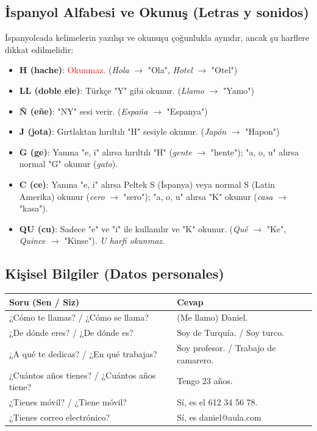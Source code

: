 \documentclass[12pt,a4paper]{article}
\begin{document}
\subsection{İspanyol Alfabesi ve Okunuş (Letras y sonidos)}
İspanyolcada kelimelerin yazılışı ve okunuşu çoğunlukla aynıdır, ancak şu harflere dikkat edilmelidir:
\begin{itemize}
    \item \textbf{H (hache)}: \textcolor{red}{Okunmaz.} (\textit{Hola} $\rightarrow$ "Ola", \textit{Hotel} $\rightarrow$ "Otel")
    \item \textbf{LL (doble ele)}: Türkçe "Y" gibi okunur. (\textit{Llamo} $\rightarrow$ "Yamo")
    \item \textbf{Ñ (eñe)}: "NY" sesi verir. (\textit{España} $\rightarrow$ "Espanya")
    \item \textbf{J (jota)}: Gırtlaktan hırıltılı "H" sesiyle okunur. (\textit{Japón} $\rightarrow$ "Hapon")
    \item \textbf{G (ge)}: Yanına "e, i" alırsa hırıltılı "H" (\textit{gente} $\rightarrow$ "hente"); "a, o, u" alırsa normal "G" okunur (\textit{gato}).
    \item \textbf{C (ce)}: Yanına "e, i" alırsa Peltek S (İspanya) veya normal S (Latin Amerika) okunur (\textit{cero} $\rightarrow$ "sero"); "a, o, u" alırsa "K" okunur (\textit{casa} $\rightarrow$ "kasa").
    \item \textbf{QU (cu)}: Sadece "e" ve "i" ile kullanılır ve "K" okunur. (\textit{Qué} $\rightarrow$ "Ke", \textit{Quince} $\rightarrow$ "Kinse"). \textit{U harfi okunmaz.}
\end{itemize}

\subsection{Kişisel Bilgiler (Datos personales)}
\begin{table}[h]
\centering
\begin{tabularx}{\textwidth}{l X}
\toprule
\textbf{Soru (Sen / Siz)} & \textbf{Cevap} \\
\midrule
¿Cómo te llamas? / ¿Cómo se llama? & (Me llamo) Daniel. \\
¿De dónde eres? / ¿De dónde es? & Soy de Turquía. / Soy turco. \\
¿A qué te dedicas? / ¿En qué trabajas? & Soy profesor. / Trabajo de camarero. \\
¿Cuántos años tienes? / ¿Cuántos años tiene? & Tengo 23 años. \\
¿Tienes móvil? / ¿Tiene móvil? & Sí, es el 612 34 56 78. \\
¿Tienes correo electrónico? & Sí, es daniel@aula.com \\
\bottomrule
\end{tabularx}
\end{table}
\end{document}
